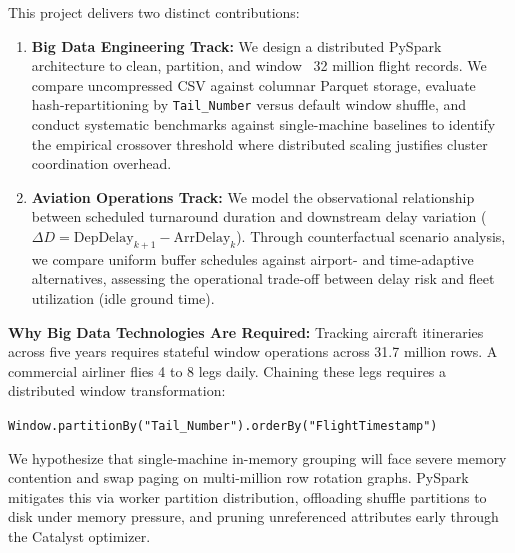 \documentclass{article}
\begin{document}
This project delivers two distinct contributions:
\begin{enumerate}
    \item \textbf{Big Data Engineering Track:} We design a distributed PySpark architecture to clean, partition, and window ~32 million flight records. We compare uncompressed CSV against columnar Parquet storage, evaluate hash-repartitioning by \texttt{Tail\_Number} versus default window shuffle, and conduct systematic benchmarks against single-machine baselines to identify the empirical crossover threshold where distributed scaling justifies cluster coordination overhead.
    \item \textbf{Aviation Operations Track:} We model the observational relationship between scheduled turnaround duration and downstream delay variation ($\Delta D = \text{DepDelay}_{k+1} - \text{ArrDelay}_k$). Through counterfactual scenario analysis, we compare uniform buffer schedules against airport- and time-adaptive alternatives, assessing the operational trade-off between delay risk and fleet utilization (idle ground time).
\end{enumerate}

\noindent\textbf{Why Big Data Technologies Are Required:} Tracking aircraft itineraries across five years requires stateful window operations across 31.7 million rows. A commercial airliner flies 4 to 8 legs daily. Chaining these legs requires a distributed window transformation:
\begin{center}
\texttt{Window.partitionBy("Tail\_Number").orderBy("FlightTimestamp")}
\end{center}
We hypothesize that single-machine in-memory grouping will face severe memory contention and swap paging on multi-million row rotation graphs. PySpark mitigates this via worker partition distribution, offloading shuffle partitions to disk under memory pressure, and pruning unreferenced attributes early through the Catalyst optimizer.
\end{document}
